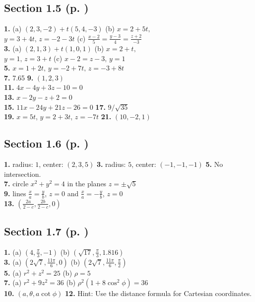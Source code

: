 \begin{multicols}{2}
\subsection*{Section 1.5 (p. \pageref{sec1dot5})}
\textbf{1.} (a) $(2,3,-2) + t(5,4,-3)$ \quad (b) $x = 2 + 5t,$\\$y = 3 + 4t, \, z = -2 - 3t$ \quad (c) $\frac{x - 2}{5} =
\frac{y - 3}{4} = \frac{z + 2}{-3}$\\\textbf{3.} (a) $(2,1,3) + t(1,0,1)$ \quad (b) $x = 2 + t,$\\$y = 1, \, z = 3 + t$
\quad (c) $x - 2 = z - 3, \, y = 1$\\\textbf{5.} $x = 1 + 2t, \, y = -2 + 7t, \, z = -3 + 8t$\\\textbf{7.} 7.65 \quad
\textbf{9.} $(1,2,3)$\\\textbf{11.} $4x - 4y + 3z - 10 = 0$\\\textbf{13.} $x - 2y - z + 2 = 0$\\\textbf{15.}
$11x - 24y + 21z - 26 = 0$ \quad \textbf{17.} $9/\sqrt{35}$\\\textbf{19.} $x = 5t$, $y = 2 + 3t$, $z = -7t$
\quad \textbf{21.} $(10,-2,1)$
\subsection*{Section 1.6 (p. \pageref{sec1dot6})}
\textbf{1.} radius: $1$, center: $(2,3,5)$ \quad \textbf{3.} radius: $5$, center: $(-1,-1,-1)$ \quad \textbf{5.} No
intersection.\\\textbf{7.} circle $x^2 + y^2 = 4$ in the planes $z = \pm \sqrt{5}$\\\textbf{9.} lines
$\frac{x}{a} = \frac{y}{b}$, $z = 0$ and $\frac{x}{a} = -\frac{y}{b}$, $z = 0$\\\textbf{13.}
$\left( \frac{2a}{2 - c}, \frac{2b}{2 - c}, 0 \right)$
\subsection*{Section 1.7 (p. \pageref{sec1dot7})}
\textbf{1.} (a) $(4,\frac{\pi}{3},-1)$ \quad (b) $(\sqrt{17},\frac{\pi}{3},1.816)$\\\textbf{3.} (a)
$(2\sqrt{7},\frac{11\pi}{6},0)$ \quad (b) $(2\sqrt{7},\frac{11\pi}{6},\frac{\pi}{2})$\\\textbf{5.} (a) $r^2 + z^2 = 25$
\quad (b) $\rho = 5$\\\textbf{7.} (a) $r^2 + 9z^2 = 36$ \quad (b) $\rho^2 ( 1 + 8 \cos^2 \phi ) = 36$\\
\textbf{10.} $(a,\theta,a \cot \phi )$ \quad \textbf{12.} Hint: Use the distance formula for Cartesian coordinates.

\end{multicols}
